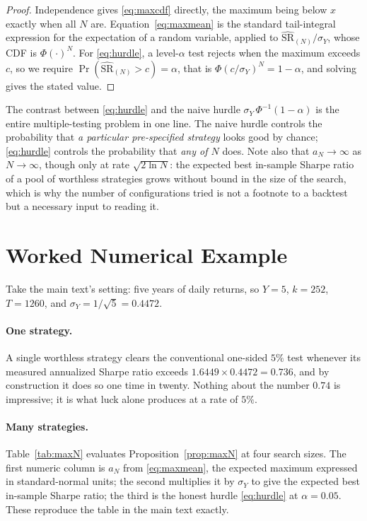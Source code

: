 \documentclass[11pt]{article}
\theoremstyle{remark}
\theoremstyle{definition}
\newcommand{\SRhat}{\widehat{\text{SR}}}
\begin{document}
\begin{proof}
Independence gives \eqref{eq:maxcdf} directly, the maximum being below $x$ exactly when all $N$ are. Equation~\eqref{eq:maxmean} is the standard tail-integral expression for the expectation of a random variable, applied to $\SRhat_{(N)}/\sigma_Y$, whose CDF is $\Phi(\cdot)^N$. For \eqref{eq:hurdle}, a level-$\alpha$ test rejects when the maximum exceeds $c$, so we require $\Pr(\SRhat_{(N)} > c) = \alpha$, that is $\Phi(c/\sigma_Y)^N = 1-\alpha$, and solving gives the stated value.
\end{proof}

The contrast between \eqref{eq:hurdle} and the naive hurdle $\sigma_Y\,\Phi^{-1}(1-\alpha)$ is the entire multiple-testing problem in one line. The naive hurdle controls the probability that \emph{a particular pre-specified strategy} looks good by chance; \eqref{eq:hurdle} controls the probability that \emph{any of $N$} does. Note also that $a_N \to \infty$ as $N \to \infty$, though only at rate $\sqrt{2\ln N}$: the expected best in-sample Sharpe ratio of a pool of worthless strategies grows without bound in the size of the search, which is why the number of configurations tried is not a footnote to a backtest but a necessary input to reading it.

\section{Worked Numerical Example}
\label{sec:example}

Take the main text's setting: five years of daily returns, so $Y=5$, $k=252$, $T=1260$, and $\sigma_Y = 1/\sqrt{5} = 0.4472$.

\paragraph{One strategy.} A single worthless strategy clears the conventional one-sided $5\%$ test whenever its measured annualized Sharpe ratio exceeds $1.6449 \times 0.4472 = 0.736$, and by construction it does so one time in twenty. Nothing about the number $0.74$ is impressive; it is what luck alone produces at a rate of $5\%$.

\paragraph{Many strategies.} Table~\ref{tab:maxN} evaluates Proposition~\ref{prop:maxN} at four search sizes. The first numeric column is $a_N$ from \eqref{eq:maxmean}, the expected maximum expressed in standard-normal units; the second multiplies it by $\sigma_Y$ to give the expected best in-sample Sharpe ratio; the third is the honest hurdle \eqref{eq:hurdle} at $\alpha = 0.05$. These reproduce the table in the main text exactly.
\end{document}
